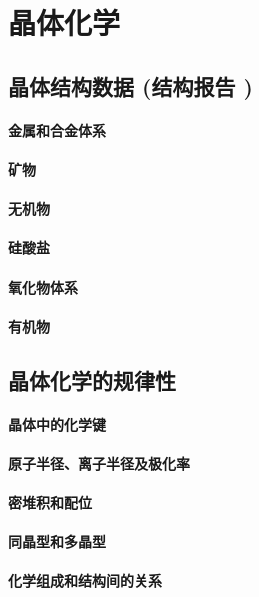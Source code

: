 \documentclass[UTF8]{../NatureUniverse}
\begin{document}
\chapter{晶体化学}
\section{晶体结构数据 (结构报告 )}
    \subsubsection{金属和合金体系}
    \subsubsection{矿物}
    \subsubsection{无机物}
    \subsubsection{硅酸盐}
    \subsubsection{氧化物体系}
    \subsubsection{有机物}
\section{晶体化学的规律性}
    \subsubsection{晶体中的化学键}
    \subsubsection{原子半径、离子半径及极化率}
    \subsubsection{密堆积和配位}
    \subsubsection{同晶型和多晶型}
    \subsubsection{化学组成和结构间的关系}
\end{document}
